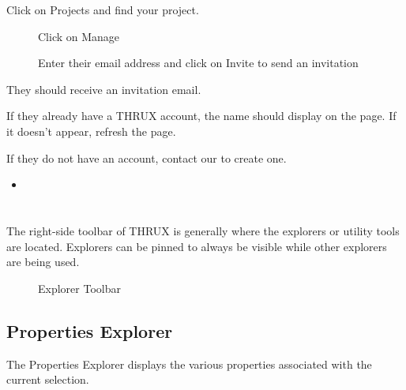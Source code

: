\documentclass[letterpaper,10pt,english]{sphinxmanual}
\begin{document}
Click on Projects and find your project.

\begin{figure}[H]
\centering
\capstart

\noindent{}
\caption{Click on Manage}\label{\detokenize{docs/userguide/projectmanagement/accessibility/index-accessibility:id4}}\end{figure}

\begin{figure}[H]
\centering
\capstart

\noindent{}
\caption{Enter their email address and click on Invite to send an invitation}\label{\detokenize{docs/userguide/projectmanagement/accessibility/index-accessibility:id5}}\end{figure}

They should receive an invitation email.

If they already have a THRUX account, the name should display on the page.  If it doesn’t appear, refresh the page.

If they do not have an account, contact our {\hyperref[\detokenize{docs/introduction/index-thrux:support}]{}} to create one.
\begin{itemize}
\item {} 

\end{itemize}


\section{}
\label{\detokenize{docs/userguide/index-user_guide:explorers-and-other-utility-tools}}\label{\detokenize{docs/userguide/index-user_guide:id10}}
The right-side toolbar of THRUX is generally where the explorers or utility tools are located.  Explorers can be pinned to always be visible while other explorers are being used.

\begin{figure}[H]
\centering
\capstart

\noindent{}
\caption{Explorer Toolbar}\label{\detokenize{docs/userguide/index-user_guide:id30}}\end{figure}


\subsection{Properties Explorer}
\label{\detokenize{docs/userguide/explorersandutilitytools/propertiesexplorer/index-properties_explorer:properties-explorer}}\label{\detokenize{docs/userguide/explorersandutilitytools/propertiesexplorer/index-properties_explorer:id1}}\label{\detokenize{docs/userguide/explorersandutilitytools/propertiesexplorer/index-properties_explorer::doc}}
The Properties Explorer displays the various properties associated with the current selection.
\end{document}
